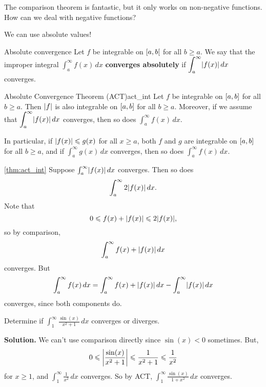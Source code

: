 The comparison theorem is fantastic, but it only works on non-negative functions. How
can we deal with negative functions?

We can use absolute values!

\begin{Definition}{Absolute convergence}{}
    Let $ f $ be integrable on $ \interval[open right]{a}{b} $ for all $ b\geqslant a $.
    We say that the improper integral $ \displaystyle \int_{a}^{\infty} f(x)\, d{x} $
    \textbf{converges absolutely} if
    $ \displaystyle \int_{a}^{\infty} \abs{f(x)}\, d{x} $
    converges.
\end{Definition}

\begin{Theorem}{Absolute Convergence Theorem (ACT)}{act_int}
    Let $ f $ be integrable on $ \interval{a}{b} $ for all $ b\geqslant a $.
    Then $ \abs{f} $ is also integrable on $ \interval{a}{b} $ for all $ b\geqslant a $.
    Moreover, if we assume that
    $ \displaystyle \int_{a}^{\infty} \abs{f(x)}\, d{x} $
    converges, then so does
    $ \displaystyle  \int_{a}^{\infty} f(x)\, d{x} $.

    In particular, if $ \abs{f(x)}\leqslant g(x) $ for all $ x\geqslant a $,
    both $ f $ and $ g $ are integrable on $ \interval{a}{b} $ for all $ b\geqslant a $,
    and if $ \displaystyle \int_{a}^{\infty} g(x)\, d{x}  $ converges, then so does
    $ \displaystyle \int_{a}^{\infty} f(x)\, d{x} $.
\end{Theorem}

\begin{Proof}{\ref{thm:act_int}}{}
    Suppose $ \int_{a}^{\infty} \abs{f(x)}\, d{x} $ converges. Then so does
    \[ \int_{a}^{\infty} 2\abs{f(x)}\, d{x}. \]
    Note that
    \[ 0\leqslant f(x)+\abs{f(x)}\leqslant 2\abs{f(x)}, \]
    so by comparison,
    \[ \int_{a}^{\infty} f(x)+\abs{f(x)}\, d{x} \]
    converges. But
    \[ \int_{a}^{\infty} f(x)\, d{x} =\int_{a}^{\infty} f(x)+\abs{f(x)}\, d{x} -
        \int_{a}^{\infty} \abs{f(x)}\, d{x}  \]
    converges, since both components do.
\end{Proof}

\begin{Example}{}{}
    Determine if $ \displaystyle \int_{1}^{\infty} \frac{\sin(x)}{x^2+1} \, d{x} $
    converges or diverges.

    \textbf{Solution.}
    We can't use comparison directly since $ \sin(x)<0 $ sometimes. But,
    \[ \displaystyle  0\leqslant \abs*{\frac{\sin(x)}{x^2+1} }\leqslant \frac{1}{x^2+1}
        \leqslant \frac{1}{x^2} \]
    for $ x\geqslant 1 $, and $ \displaystyle \int_{1}^{\infty} \frac{1}{x^2} \, d{x}  $ converges. So by
    ACT, $ \displaystyle \int_{1}^{\infty} \frac{\sin(x)}{1+x^2} \, d{x}  $ converges.
\end{Example}

